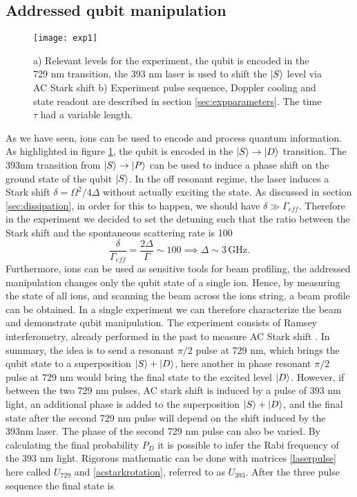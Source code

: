 \subsection{Addressed qubit manipulation}
\label{sec:expqubit}
\begin{figure}
\centering
\texttt{[image: exp1]}
\caption{a) Relevant levels for the experiment, the qubit is encoded in the 729 nm transition, the 393 nm laser is used to shift the $\ket{S}$ level via AC Stark shift b) Experiment pulse sequence, Doppler cooling and state readout are described in section \ref{sec:expparameters}. The time $\tau$ had a variable length.}
\label{sequence}
\end{figure}
As we have seen, ions can be used to encode and process quantum information. As highlighted in figure \ref{sequence}, the qubit is encoded in the $\ket{S} \to \ket{D}$ transition. The 393nm transition from $\ket{S}\to \ket{P}$ can be used to induce a phase shift on the ground state of the qubit $\ket{S}$. In the off resonant regime, the laser induces a Stark shift $\delta = \Omega^2/4\Delta$ without actually exciting the state. As discussed in section \ref{sec:dissipation}, in order for this to happen, we should have $\delta \gg \Gamma_{eff}$. Therefore in the experiment we decided to set the detuning such that the ratio between the Stark shift and the spontaneous scattering rate is 100
\begin{equation}
\frac{\delta}{\Gamma_{eff}} = \frac{2\Delta}{\Gamma} \sim 100 \implies \Delta \sim 3\,\text{GHz}.
\end{equation}
Furthermore, ions can be used as sensitive tools for beam profiling, the addressed manipulation changes only the qubit state of a single ion. Hence, by measuring the state of all ions, and scanning the beam across the ions string, a beam profile can be obtained. In a single experiment we can therefore characterize the beam and demonstrate qubit manipulation.
The experiment consists of Ramsey interferometry, already performed in the past to measure AC Stark shift \cite{starkshift}.
In summary, the idea is to send a resonant $\pi/2$ pulse at 729 nm, which brings the qubit state to a superposition $\ket{S}+\ket{D}$, here another in phase resonant $\pi/2$ pulse at 729 nm would bring the final state to the excited level $\ket{D}$. However, if between the two 729 nm pulses, AC stark shift is induced by a pulse of 393 nm light, an additional phase is added to the superposition $\ket{S}+\ket{D}$, and the final state after the second 729 nm pulse will depend on the shift induced by the 393nm laser. The phase of the second 729 nm pulse can also be varied. By calculating the final probability $P_D$ it is possible to infer the Rabi frequency of the 393 nm light. Rigorous mathematic can be done with matrices \eqref{laserpulse} here called $U_{729}$ and \eqref{acstarkrotation}, referred to as $U_{393}$. After the three pulse sequence the final state is
